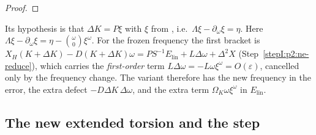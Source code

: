 \begin{proof}
\end{proof}

\begin{remark}\label{bpI:p2:newton-open}
Its hypothesis is that $\Delta K=P\xi$ with $\xi$ from , i.e.\ $\Lambda\xi-\partial_\omega\xi=\eta$. Here $\Lambda\xi-\partial_\omega\xi=\eta-\binom\omega0\xi^\omega$. For the frozen frequency the first bracket is
$X_H(K+\Delta K)-D(K+\Delta K)\omega=PS^{-1}E_{\mathrm{lin}}+L\Delta\omega+\Delta^2X$ (Step~\ref{stepI:p2:ne-reduce}),
which carries the \emph{first-order} term $L\Delta\omega=-L\omega\xi^\omega=O(\varepsilon)$, cancelled only by the frequency change.
The variant therefore has the new frequency in the error, the extra defect $-D\Delta K\,\Delta\omega$, and the extra term $\Omega_K\omega\xi^\omega$ in $E_{\mathrm{lin}}$.
\end{remark}

\subsection{The new extended torsion and the step}\label{bpI:p2:sec-step}

